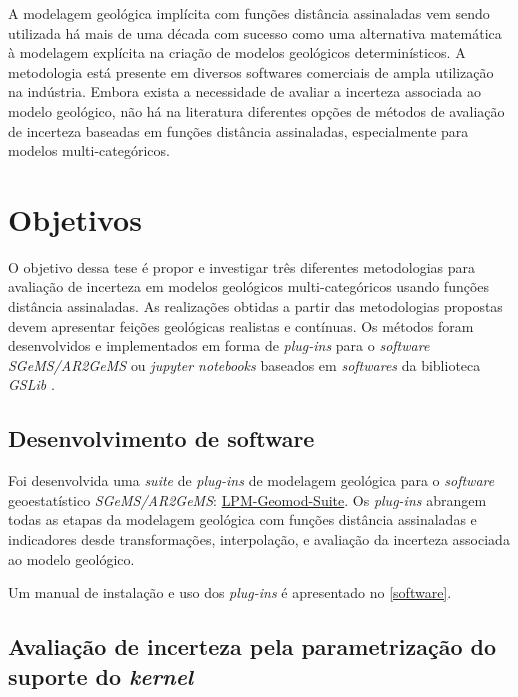 \begin{tcolorbox}
A modelagem geológica implícita com funções distância assinaladas vem sendo utilizada há mais de uma década com sucesso como uma alternativa matemática à modelagem explícita na criação de modelos geológicos determinísticos. A metodologia está presente em diversos softwares comerciais de ampla utilização na indústria. Embora exista a necessidade de avaliar a incerteza associada ao modelo geológico, não há na literatura diferentes opções de métodos de avaliação de incerteza baseadas em funções distância assinaladas, especialmente para modelos multi-categóricos.
\end{tcolorbox}

\section{Objetivos}

O objetivo dessa tese é propor e investigar três diferentes metodologias para avaliação de incerteza em modelos geológicos   multi-categóricos usando funções distância assinaladas. As realizações obtidas a partir das metodologias propostas devem apresentar feições geológicas realistas e contínuas. Os métodos foram desenvolvidos e implementados em forma de \textit{plug-ins} para o \textit{software SGeMS/AR2GeMS} \cite{remy2009applied} ou \textit{jupyter notebooks} baseados em \textit{softwares} da biblioteca \textit{GSLib} \cite{deutsch1992geostatistical}.

\subsection{Desenvolvimento de software}

Foi desenvolvida uma \textit{suite} de \textit{plug-ins} de modelagem geológica para o \textit{software} geoestatístico \textit{SGeMS/AR2GeMS}: \href{https://github.com/robertorolo/LPM-Geomod_Suite}{LPM-Geomod-Suite}. Os \textit{plug-ins} abrangem todas as etapas da modelagem geológica com funções distância assinaladas e indicadores desde transformações, interpolação, e avaliação da incerteza associada ao modelo geológico. 

Um manual de instalação e uso dos \textit{plug-ins} é apresentado no \autoref{software}. 

\subsection{Avaliação de incerteza pela parametrização do suporte do \textit{kernel}}

